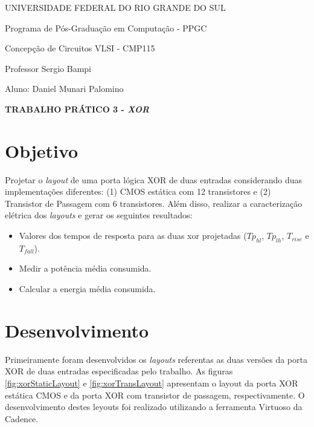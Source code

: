 \documentclass[a4paper,10pt] {article}
\begin{document}
\begin {center}
UNIVERSIDADE FEDERAL DO RIO GRANDE DO SUL

Programa de Pós-Graduação em Computação - PPGC

Concepção de Circuitos VLSI - CMP115

Professor Sergio Bampi

Aluno: Daniel Munari Palomino 

\vspace{7mm}
\textbf{ TRABALHO PRÁTICO 3 - \textit{XOR} }
\vspace{7mm}

\end{center}

\section{Objetivo}
Projetar o \textit{layout} de uma porta lógica XOR de duas entradas considerando duas implementações diferentes: (1) CMOS estática com 12 transistores e (2) Transistor de Passagem com 6 transistores. Além disso, realizar a caracterização elétrica dos \textit{layouts} e gerar os seguintes resultados:

\begin{itemize}
\item Valores dos tempos de resposta para as duas xor projetadas ($Tp_{hl}$, $Tp_{lh}$, $T_{rise}$ e $T_{fall}$).
\item Medir a potência média consumida.
\item Calcular a energia média consumida.

\end{itemize}

\section{Desenvolvimento}

Primeiramente foram desenvolvidos os \textit{layouts} referentas as duas versões da porta XOR de duas entradas especificadas pelo trabalho.
As figuras \ref{fig:xorStaticLayout} e \ref{fig:xorTransLayout} apresentam o layout da porta XOR estática CMOS e da porta XOR com transistor de passagem,
respectivamente. O desenvolvimento destes leyouts foi realizado utilizando a ferramenta Virtuoso da Cadence.
\end{document}
